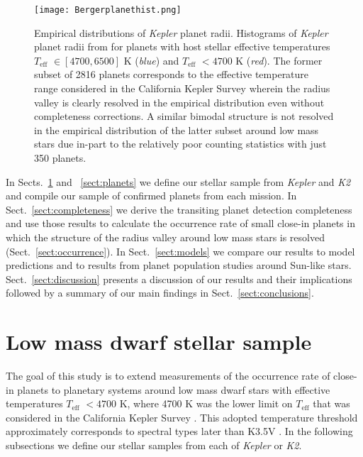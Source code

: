 \documentclass[twocolumn]{emulateapj}
\newcommand{\kepler}[1]{\emph{Kepler}#1}
\newcommand{\ktwo}[1]{\emph{K2}#1}
\newcommand{\teff}[1]{$T_{\text{eff}}$#1}
\begin{document}
\begin{figure}
  \centering
  \texttt{[image: Bergerplanethist.png]}
  \caption{Empirical distributions of \kepler{} planet radii. Histograms of \kepler{} planet radii
    from \cite{berger18} for planets with host stellar effective temperatures \teff{} $\in [4700,6500]$ K
    (\emph{blue}) and \teff{} $<4700$ K (\emph{red}). The former subset of 2816 planets corresponds to the
    effective temperature range considered in the California Kepler Survey \citep{fulton17}
    wherein the radius valley is clearly
    resolved in the empirical distribution even without completeness corrections. A similar bimodal
    structure is not resolved in the empirical distribution of the latter subset around low mass stars
    due in-part to the relatively poor counting statistics with just 350 planets.}
  \label{fig:berger}
\end{figure}


In Sects.~\ref{sect:stars} and ~\ref{sect:planets} we define our stellar sample from \kepler{} and \ktwo{}
and compile our sample of confirmed planets from each mission.
In Sect.~\ref{sect:completeness} we derive the transiting planet detection completeness and use those results
to calculate the occurrence rate of small close-in planets in which the structure of the radius valley around
low mass stars is resolved (Sect.~\ref{sect:occurrence}). In Sect.~\ref{sect:models} we compare our results to
model predictions and to results from planet population studies around Sun-like stars. 
Sect.~\ref{sect:discussion} presents a discussion of our results
and their implications followed by a summary of our main findings in Sect.~\ref{sect:conclusions}.


\section{Low mass dwarf stellar sample} \label{sect:stars}
The goal of this study is to extend measurements of the occurrence rate of close-in planets to planetary systems
around low mass dwarf stars with effective temperatures \teff{} $<4700$ K, where 4700 K was the lower limit on
\teff{} that was considered in the California Kepler Survey \citep[CKS;][]{fulton17}.
This adopted temperature threshold approximately corresponds to spectral types later than
K3.5V \citep{pecaut13}. In the following subsections we define our stellar samples from each of \kepler{} or \ktwo{.}
\end{document}
